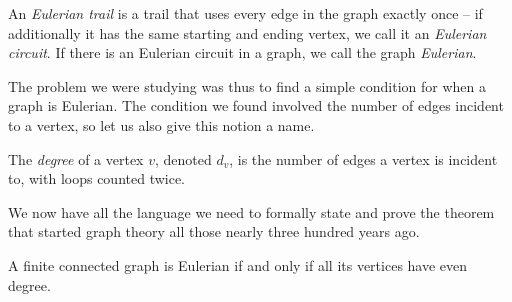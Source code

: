 \documentclass[nobib]{tufte-handout}
\begin{document}
\begin{definition}
  An \emph{Eulerian trail} is a trail that uses every edge in the graph exactly once -- if additionally it has the same starting and ending vertex, we call it an \emph{Eulerian circuit}. If there is an Eulerian circuit in a graph, we call the graph \emph{Eulerian}.
\end{definition}

The problem we were studying was thus to find a simple condition for when a graph is Eulerian. The condition we found involved the number of edges incident to a vertex, so let us also give this notion a name.

\begin{definition}
  The \emph{degree} of a vertex $v$, denoted $d_v$, is the number of edges a vertex is incident to, with loops counted twice.
\end{definition}

We now have all the language we need to formally state and prove the theorem that started graph theory all those nearly three hundred years ago.

\begin{theorem}[Euler (1736)]
  A finite connected graph is Eulerian if and only if all its vertices have even degree.
\end{theorem}

%
%
\end{document}
